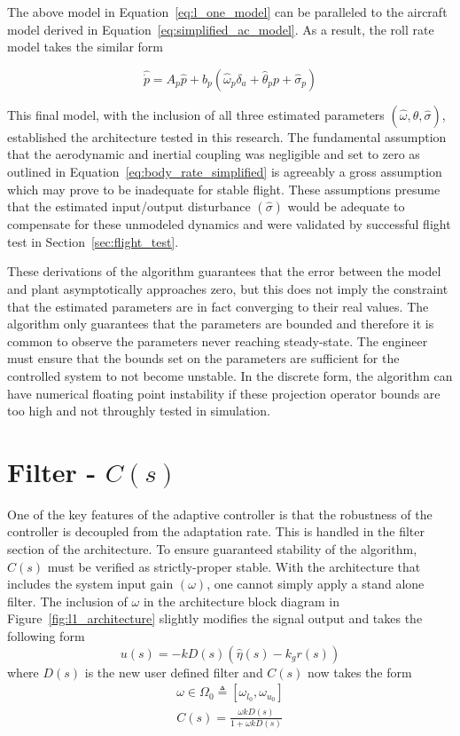 The above model in Equation~\ref{eq:l_one_model} can be paralleled to the aircraft model derived in Equation~\ref{eq:simplified_ac_model}.  As a result, the roll rate model takes the similar form

\begin{equation}
 \hat{\dot{p}}=A_p\hat{p}+b_p\left(\hat{\omega}_p\delta_a+\hat{\theta}_pp+\hat{\sigma}_p\right)
\end{equation}

This final model, with the inclusion of all three estimated parameters $(\hat{\omega}, \hat{\theta}, \hat{\sigma})$, established the architecture tested in this research.  The fundamental assumption that the aerodynamic and inertial coupling was negligible and set to zero as outlined in Equation~\ref{eq:body_rate_simplified} is agreeably a gross assumption which may prove to be inadequate for stable flight.  These assumptions presume that the estimated input/output disturbance $(\hat{\sigma})$ would be adequate to compensate for these unmodeled dynamics and were validated by successful flight test in Section~\ref{sec:flight_test}.  

These derivations of the \Lone algorithm guarantees that the error between the model and plant asymptotically approaches zero, but this does not imply the constraint that the estimated parameters are in fact converging to their real values.  The algorithm only guarantees that the parameters are bounded and therefore it is common to observe the parameters never reaching steady-state.  The engineer must ensure that the bounds set on the parameters are sufficient for the controlled system to not become unstable.  In the discrete form, the algorithm can have numerical floating point instability if these projection operator bounds are too high and not throughly tested in simulation.

\section{\Lone Filter - $C(s)$}\label{sec:l1_filter}
One of the key features of the \Lone adaptive controller is that the robustness of the controller is decoupled from the adaptation rate.  This is handled in the filter section of the \Lone architecture.  To ensure guaranteed stability of the \Lone algorithm, $C(s)$ must be verified as strictly-proper stable.  With the architecture that includes the system input gain $(\omega)$, one cannot simply apply a stand alone filter.  The inclusion of $\omega$ in the architecture block diagram in Figure~\ref{fig:l1_architecture} slightly modifies the signal output and takes the following form
\begin{equation}
u(s)=-kD(s)(\hat{\eta}(s)-k_gr(s))
\end{equation}
where $D(s)$ is the new user defined filter and $C(s)$ now takes the form
\begin{equation}
\begin{split}
\omega \in \Omega_0 \triangleq [\omega_{l_0},\omega_{u_0}]\\
C(s)=\frac{\omega kD(s)}{1+\omega kD(s)}
\end{split}
\end{equation}

